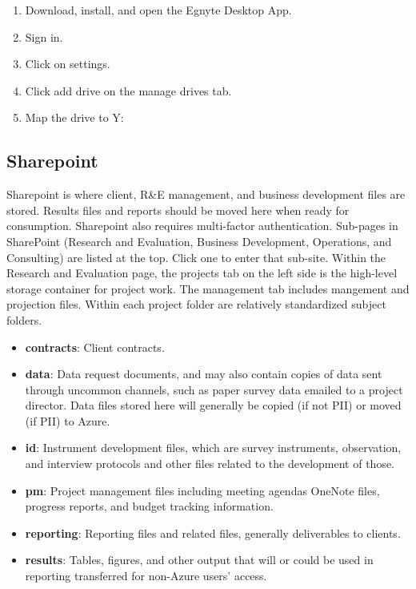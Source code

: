 {\begin{enumerate}
	\item Download, install, and open the Egnyte Desktop App.
	\item Sign in.
	\item Click on settings.
	\item Click add drive on the manage drives tab.
	\item Map the drive to Y:
\end{enumerate}

\subsection{Sharepoint}
Sharepoint is where client, R\&E management, and business development files are stored. Results files and reports should be moved here when ready for consumption. Sharepoint also requires multi-factor authentication. Sub-pages in SharePoint (Research and Evaluation, Business Development, Operations, and Consulting) are listed at the top. Click one to enter that sub-site. Within the Research and Evaluation page, the projects tab on the left side is the high-level storage container for project work. The management tab includes mangement and projection files. Within each project folder are relatively standardized subject folders.

\begin{itemize}
	\item\textbf{contracts}: Client contracts.
	\item\textbf{data}: Data request documents, and may also contain copies of data sent through uncommon channels, such as paper survey data emailed to a project director. Data files stored here will generally be copied (if not PII) or moved (if PII) to Azure.
	\item\textbf{id}: Instrument development files, which are survey instruments, observation, and interview protocols  and other files related to the development of those.
	\item\textbf{pm}: Project management files including meeting agendas OneNote files, progress reports, and budget tracking information.
	\item\textbf{reporting}: Reporting files and related files, generally deliverables to clients.
	\item\textbf{results}: Tables, figures, and other output that will or could be used in reporting transferred for non-Azure users' access.
\end{itemize}

}
